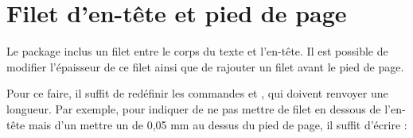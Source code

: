 \section{Filet d'en-tête et pied de page}

Le package  inclus un filet entre le corps du texte et l'en-tête. Il est possible de modifier l'épaisseur de ce filet ainsi que de rajouter un filet avant le  pied de page.

Pour ce faire, il suffit de redéfinir les commandes  et , qui doivent renvoyer une longueur.
Par exemple, pour indiquer de ne pas mettre de filet en dessous de l'en-tête mais d'un mettre un de 0,05 mm au  dessus du pied de page, il suffit d'écrire : 

\begin{latexcode}
\renewcommand{\headrulewidth}[0]{0pt}
\renewcommand{\footrulewidth}[0]{0.05mm}
\end{latexcode}
